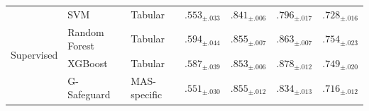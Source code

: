 \begin{table}[ht]
{\begin{tabular}{lllcccc}
\midrule
\multirow{4}{*}{Supervised} 
& SVM & Tabular & \cellcolor{blue!50} $.553_{ \pm .033 }$ & \cellcolor{blue!50} $.841_{ \pm .006 }$ & \cellcolor{blue!50} $.796_{ \pm .017 }$ & \cellcolor{blue!50} $.728_{ \pm .016 }$  \\
& Random Forest & Tabular & \cellcolor{blue!50} $\mathbf{.594_{ \pm .044 }}$ & \cellcolor{blue!50} $.855_{ \pm .007 }$ & \cellcolor{blue!50} $.863_{ \pm .007 }$ & \cellcolor{blue!50} $\mathbf{.754_{ \pm .023 }}$  \\
& XGBoost & Tabular & \cellcolor{blue!50} $.587_{ \pm .039 }$ & \cellcolor{blue!50} $.853_{ \pm .006 }$ & \cellcolor{blue!50} $\mathbf{.878_{ \pm .012 }}$ & \cellcolor{blue!50} $.749_{ \pm .020 }$  \\
& G-Safeguard & MAS-specific & \cellcolor{blue!50} $.551_{ \pm .030 }$ & \cellcolor{blue!50} $\mathbf{.855_{ \pm .012 }}$ & \cellcolor{blue!50} $.834_{ \pm .013 }$ & \cellcolor{blue!50} $.716_{ \pm .012 }$  \\
\bottomrule
    \end{tabular}}
\end{table}

